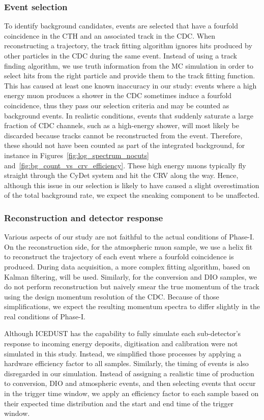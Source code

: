 \subsubsection{Event selection}

To identify background candidates, events are selected that have a fourfold
coincidence in the CTH and an associated track in the CDC. When reconstructing a
trajectory, the track fitting algorithm ignores hits produced by other particles
in the CDC during the same event. Instead of using a track finding algorithm, we
use truth information from the MC simulation in order to select hits from the
right particle and provide them to the track fitting function. This has caused
at least one known inaccuracy in our study: events where a high energy muon
produces a shower in the CDC sometimes induce a fourfold coincidence, thus they
pass our selection criteria and may be counted as background events. In
realistic conditions, events that suddenly saturate a large fraction of CDC
channels, such as a high-energy shower, will most likely be discarded because
tracks cannot be reconstructed from the event. Therefore, these should not have
been counted as part of the integrated background, for instance in
Figures~\ref{fig:log_spectrum_nocuts} and~\ref{fig:bg_count_vs_crv_efficiency}.
These high energy muons typically fly straight through the CyDet system and hit
the CRV along the way. Hence, although this issue in our selection is likely to
have caused a slight overestimation of the total background rate, we expect the
sneaking component to be unaffected.

\subsubsection{Reconstruction and detector response}
Various aspects of our study are not faithful to the actual conditions of
Phase\nobreakdash-I. On the reconstruction side, for the atmospheric muon sample, we use a
helix fit to reconstruct the trajectory of each event where a fourfold
coincidence is produced. During data acquisition, a more complex fitting
algorithm, based on Kalman filtering, will be used. Similarly, for the
conversion and DIO samples, we do not perform reconstruction but naively
smear the true momentum of the track using the design momentum resolution of the
CDC. Because of those simplifications, we expect the resulting momentum spectra
to differ slightly in the real conditions of Phase\nobreakdash-I. 

Although ICEDUST has the capability to fully simulate each sub-detector's
response to incoming energy deposits, digitisation and calibration were not
simulated in this study. Instead, we simplified those processes by applying a
hardware efficiency factor to all samples. Similarly, the timing of events is
also disregarded in our simulation. Instead of assigning a realistic time of
production to conversion, DIO and atmospheric events, and then selecting events
that occur in the trigger time window, we apply an efficiency factor to each
sample based on their expected time distribution and the start and end time of
the trigger window. 

